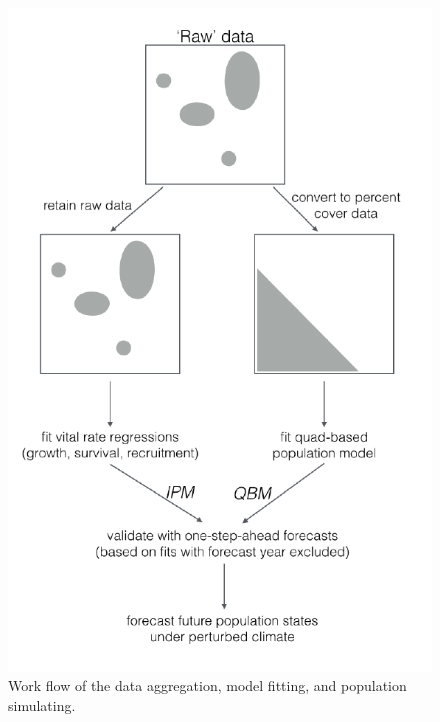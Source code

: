 \documentclass[12pt,]{article}
\begin{document}
\begin{figure}[htbp]
\centering
\includegraphics{components/figure/manuscript-figure_2.pdf}
\caption{Work flow of the data aggregation, model fitting, and
population simulating.}
\end{figure}
\end{document}
